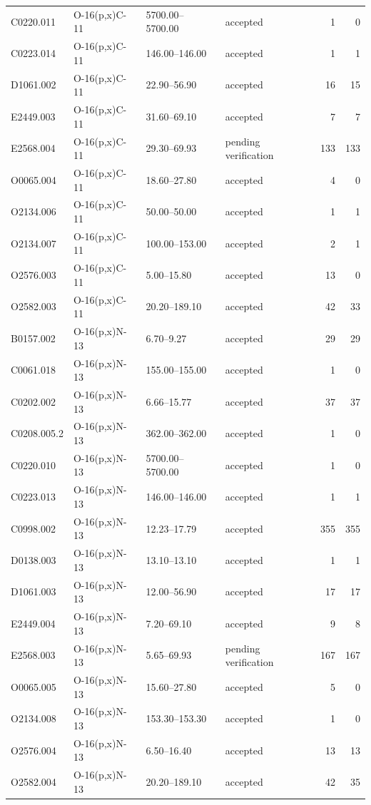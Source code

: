 \begin{longtable}{llllrr}
C0220.011 & O-16(p,x)C-11 & 5700.00--5700.00 & accepted & 1 & 0 \\
C0223.014 & O-16(p,x)C-11 & 146.00--146.00 & accepted & 1 & 1 \\
D1061.002 & O-16(p,x)C-11 & 22.90--56.90 & accepted & 16 & 15 \\
E2449.003 & O-16(p,x)C-11 & 31.60--69.10 & accepted & 7 & 7 \\
E2568.004 & O-16(p,x)C-11 & 29.30--69.93 & pending verification & 133 & 133 \\
O0065.004 & O-16(p,x)C-11 & 18.60--27.80 & accepted & 4 & 0 \\
O2134.006 & O-16(p,x)C-11 & 50.00--50.00 & accepted & 1 & 1 \\
O2134.007 & O-16(p,x)C-11 & 100.00--153.00 & accepted & 2 & 1 \\
O2576.003 & O-16(p,x)C-11 & 5.00--15.80 & accepted & 13 & 0 \\
O2582.003 & O-16(p,x)C-11 & 20.20--189.10 & accepted & 42 & 33 \\
B0157.002 & O-16(p,x)N-13 & 6.70--9.27 & accepted & 29 & 29 \\
C0061.018 & O-16(p,x)N-13 & 155.00--155.00 & accepted & 1 & 0 \\
C0202.002 & O-16(p,x)N-13 & 6.66--15.77 & accepted & 37 & 37 \\
C0208.005.2 & O-16(p,x)N-13 & 362.00--362.00 & accepted & 1 & 0 \\
C0220.010 & O-16(p,x)N-13 & 5700.00--5700.00 & accepted & 1 & 0 \\
C0223.013 & O-16(p,x)N-13 & 146.00--146.00 & accepted & 1 & 1 \\
C0998.002 & O-16(p,x)N-13 & 12.23--17.79 & accepted & 355 & 355 \\
D0138.003 & O-16(p,x)N-13 & 13.10--13.10 & accepted & 1 & 1 \\
D1061.003 & O-16(p,x)N-13 & 12.00--56.90 & accepted & 17 & 17 \\
E2449.004 & O-16(p,x)N-13 & 7.20--69.10 & accepted & 9 & 8 \\
E2568.003 & O-16(p,x)N-13 & 5.65--69.93 & pending verification & 167 & 167 \\
O0065.005 & O-16(p,x)N-13 & 15.60--27.80 & accepted & 5 & 0 \\
O2134.008 & O-16(p,x)N-13 & 153.30--153.30 & accepted & 1 & 0 \\
O2576.004 & O-16(p,x)N-13 & 6.50--16.40 & accepted & 13 & 13 \\
O2582.004 & O-16(p,x)N-13 & 20.20--189.10 & accepted & 42 & 35 \\

\end{longtable}
